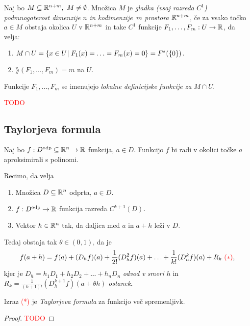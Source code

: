 \begin{definicija}
    Naj bo $M \subseteq \mathbb{R}^{n+m}, \ M \neq \emptyset$. Množica $M$ je \emph{gladka (vsaj razreda $C^1$) podmnogoterost dimenzije $n$ in kodimenzije~$m$ prostora $\mathbb{R}^{n+m}$}, če 
    za vsako točko $a \in M$ obstaja okolica $U$ v $\mathbb{R}^{n+m}$ in take $C^1$ funkcije $F_1, \ldots, F_m: U \to \mathbb{R}$, da velja:
    \begin{enumerate}
        \item $M \cap U = \left\{x \in U \,|\, F_1(x) = \ldots = F_m(x) = 0\right\} = F^*(\left\{0\right\})$.
        \item $\rang(F_1, \ldots, F_m) = m$ na $U$.
    \end{enumerate}
\end{definicija}

\begin{opomba}
    Funkcije $F_1, \ldots, F_m$ se imenujejo \emph{lokalne definicijske funkcije za $M \cap U$}.
\end{opomba}

\textcolor{red}{TODO}

\newpage
\subsection{Taylorjeva formula}
Naj bo $f: D^{\text{odp}} \subseteq \mathbb{R}^n \to \mathbb{R}$ funkcija, $a \in D$. Funkcijo $f$ bi radi v okolici točke $a$ aproksimirali s polinomi.

\begin{izrek}
    Recimo, da velja
    \begin{enumerate}
        \item Množica $D \subseteq \mathbb{R}^n$ odprta, $a \in D$.
        \item $f: D^{\text{odp}} \to \mathbb{R}$ funkcija razreda $C^{k+1}(D)$.
        \item Vektor $h \in \mathbb{R}^n$ tak, da daljica med $a$ in $a+h$ leži v $D$.
    \end{enumerate}
    Tedaj obstaja tak $\theta \in (0,1)$, da je 
    $$f(a+h) = f(a) + (D_hf)(a) + \frac{1}{2!}(D_h^2f)(a) + \ldots + \frac{1}{k!} (D_h^kf)(a) + R_k \ \textcolor{red}{(*)},$$
    kjer je $D_h = h_1D_1 + h_2D_2 + \ldots + h_nD_n$ \emph{odvod v smeri $h$} in $R_k = \frac{1}{(k+1)!} (D_h^{k+1}f)(a + \theta h)$ \emph{ostanek}.

    Izraz \textcolor{red}{(*)} je \emph{Taylorjeva formula} za funkcijo več spremenljivk.
\end{izrek}

\begin{proof}
    \textcolor{red}{TODO}
\end{proof}

